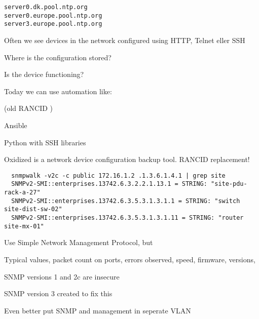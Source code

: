 \documentclass[Screen16to9,17pt]{foils}
\begin{document}
\begin{alltt}
server 0.dk.pool.ntp.org
server 0.europe.pool.ntp.org
server 3.europe.pool.ntp.org

\end{alltt}






\begin{list1}
\item Often we see devices in the network configured using HTTP, Telnet eller SSH
\begin{list2}
\item Where is the configuration stored?
\item Is the device functioning?
\end{list2}
\item Today we can use automation like:
\begin{list2}
\item (old RANCID )
\item Ansible 
\item Python with SSH libraries
\item Oxidized is a network device configuration backup tool. RANCID replacement!
\end{list2}
\end{list1}



\begin{verbatim}
  snmpwalk -v2c -c public 172.16.1.2 .1.3.6.1.4.1 | grep site
  SNMPv2-SMI::enterprises.13742.6.3.2.2.1.13.1 = STRING: "site-pdu-rack-a-27"
  SNMPv2-SMI::enterprises.13742.6.3.5.3.1.3.1.1 = STRING: "switch site-dist-sw-02"
  SNMPv2-SMI::enterprises.13742.6.3.5.3.1.3.1.11 = STRING: "router site-mx-01"
\end{verbatim}

Use Simple Network Management Protocol, but
\begin{list2}
\item Typical values, packet count on ports, errors observed, speed, firmware, versions,
\item SNMP versions 1 and 2c are insecure
\item SNMP version 3 created to fix this
\item Even better put SNMP and management in seperate VLAN
\end{list2}
\end{document}
